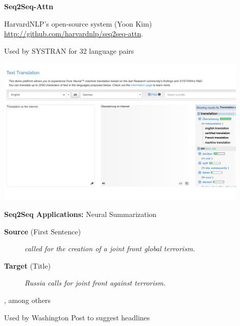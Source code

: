\documentclass{beamer}
\let\tempone\itemize
\let\temptwo\enditemize
\renewenvironment{itemize}{\tempone\addtolength{\itemsep}{0.5\baselineskip}}{\temptwo}
\newcommand{\air}{\vspace{0.25cm}}
\newcommand{\mair}{\vspace{-0.25cm}}
\newcommand{\Cite}[1]{{\footnotesize \citep{#1}}}
\begin{document}
\begin{frame}
  \centerline{\textbf{Seq2Seq-Attn}   }

  \begin{itemize}
  \item HarvardNLP's open-source system (Yoon Kim) \url{http://github.com/harvardnlp/seq2seq-attn}.
    \air 
  \item Used by SYSTRAN for 32 language pairs \Cite{systran}
  \end{itemize}

  \begin{center}
    \includegraphics[width=0.9\textwidth]{systran}
  \end{center}

\end{frame}


\begin{frame}
  \centerline{\textbf{Seq2Seq Applications:} \alert{Neural Summarization} \Cite{Rush2015} }
  \begin{center}
    \textbf{Source} (First Sentence)
  \end{center}
  
  \begin{figure}
    \textit{
      called  for the creation of
      a joint front  global terrorism. }
  \end{figure}

  \begin{center}
    \textbf{Target} (Title)
  \end{center}
  \mair

  \begin{figure}
    \centering
    \textit{\alert<2>{Russia} calls for joint
      front \alert<2>{against} terrorism.}
  \end{figure}

\air
\air

  \begin{itemize}
  \item \Cite{mou2015backward} \Cite{cheng2016neural} \Cite{toutanovadataset} \Cite{wang2016experimental} \Cite{takaseneural}, among others
  \item Used by Washington Post to suggest headlines \Cite{shuguangwang}
  \end{itemize}
\end{frame}
\end{document}
